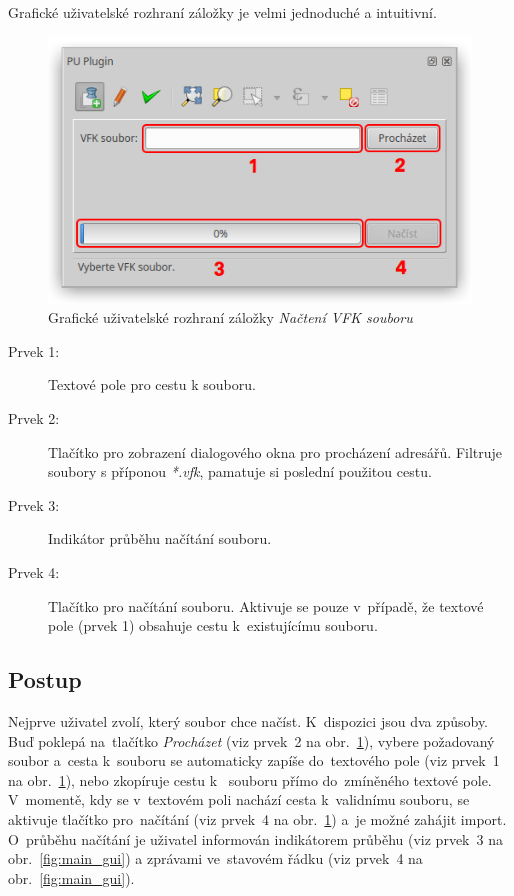 Grafické uživatelské rozhraní záložky je velmi jednoduché a intuitivní.

	\begin{figure}[H]
		\centering
		\includegraphics[width=.55\textwidth]{./pictures/nacteni_vfk_gui.png}
		\caption[Grafické uživatelské rozhraní záložky \textit{Načtení VFK souboru}]{Grafické uživatelské rozhraní záložky \textit{Načtení VFK souboru}}
		\label{fig:nacteni_vfk_gui}
 	\end{figure}

\begin{description}
	\item[Prvek 1:] Textové pole pro cestu k  souboru.
	\item[Prvek 2:] Tlačítko pro zobrazení dialogového okna pro procházení adresářů. Filtruje soubory s příponou \textit{*.vfk}, pamatuje si poslední použitou cestu.
	\item[Prvek 3:] Indikátor průběhu načítání  souboru.
	\item[Prvek 4:] Tlačítko pro načítání  souboru. Aktivuje se pouze v~případě, že textové pole (prvek 1) obsahuje cestu k~existujícímu  souboru.
\end{description}

\subsection{Postup}
\label{postup_nacteni_vfk}

Nejprve uživatel zvolí, který  soubor chce načíst. K~dispozici jsou dva způsoby. Buď poklepá na~tlačítko \textit{Procházet} (viz prvek~2 na obr.~\ref{fig:nacteni_vfk_gui}), vybere požadovaný soubor a~cesta k~souboru se automaticky zapíše do~textového pole (viz prvek~1 na obr.~\ref{fig:nacteni_vfk_gui}), nebo zkopíruje cestu k~ souboru přímo do~zmíněného textové pole. V~momentě, kdy se v~textovém poli nachází cesta k~validnímu  souboru, se aktivuje tlačítko pro~načítání (viz prvek~4 na obr.~\ref{fig:nacteni_vfk_gui}) a~je možné zahájit import. O~průběhu načítání je uživatel informován indikátorem průběhu (viz prvek~3 na obr.~\ref{fig:main_gui}) a zprávami ve~stavovém řádku (viz prvek~4 na obr.~\ref{fig:main_gui}).

